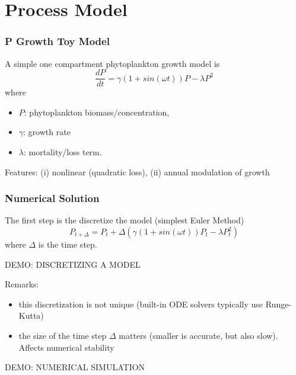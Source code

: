 \documentclass{beamer}
\begin{document}
\section{Process Model}

\frame%
{\frametitle{P Growth Toy Model}

A simple one compartment phytoplankton growth model is
\[
\frac{d P}{dt} = \gamma(1 + sin (\omega t)) P - \lambda P^2
\]
where 
\begin{itemize}
\item
$P$: phytoplankton biomass/concentration, 
\item
$\gamma$: growth rate 
\item
$\lambda$: mortality/loss term. 
\end{itemize}

\pause
Features: (i) nonlinear (quadratic loss), (ii) annual modulation of growth

}

\frame%
{\frametitle{Numerical Solution}

The first step is the discretize the model (simplest Euler Method)
\[
P_{t+\Delta} = P_t + \Delta \left( \gamma (1+sin(\omega t)) P_t  - \lambda P_t^2 \right)
\]
where $\Delta$ is the time step. 

\pause
\medskip
\color{red}  DEMO: DISCRETIZING A MODEL

\pause
\medskip
Remarks: 
\begin{itemize}
\pause
\item
this discretization is not unique (built-in ODE solvers typically use Runge-Kutta) 
\pause
\item
the size of the time step $\Delta$ matters (smaller is accurate, but also slow). Affects numerical stability 
\end{itemize}

\pause
\color{red}  DEMO: NUMERICAL SIMULATION
}
\end{document}

